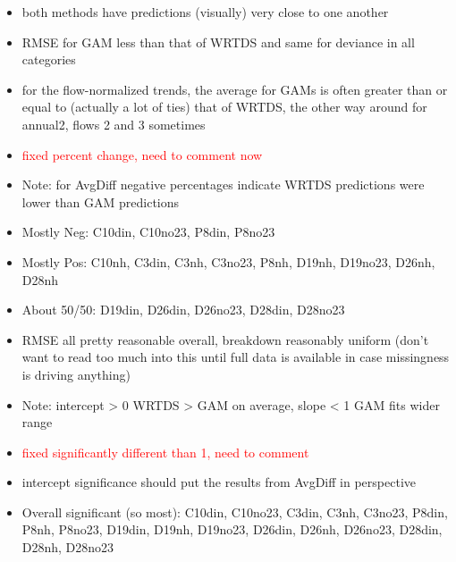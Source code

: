 \documentclass[12pt]{amsart}
\begin{document}
\begin{itemize}
\item both methods have predictions (visually) very close to one another
\item RMSE for GAM less than that of WRTDS and same for deviance in all categories 
\item for the flow-normalized trends, the average for GAMs is often greater than or equal to (actually a lot of ties) that of WRTDS, the other way around for annual2, flows 2 and 3 sometimes 
\item \textcolor{red}{fixed percent change, need to comment now}
\item  Note: for  AvgDiff negative percentages indicate WRTDS predictions were lower than GAM predictions
\item Mostly Neg: C10din, C10no23, P8din, P8no23
\item Mostly Pos: C10nh, C3din, C3nh, C3no23, P8nh, D19nh, D19no23, D26nh, D28nh
\item About 50/50: D19din, D26din, D26no23, D28din, D28no23
\item RMSE all pretty reasonable overall, breakdown reasonably uniform (don't want to read too much into this until full data is available in case missingness is driving anything)
\item Note: intercept > 0 WRTDS > GAM on average, slope < 1 GAM fits wider range
\item \textcolor{red}{fixed significantly different than 1, need to comment}
\item intercept significance should put the results from AvgDiff in perspective
\item Overall significant (so most): C10din, C10no23, C3din, C3nh, C3no23, P8din, P8nh, P8no23, D19din, D19nh, D19no23, D26din, D26nh, D26no23, D28din, D28nh, D28no23
\end{itemize}
\end{document}
